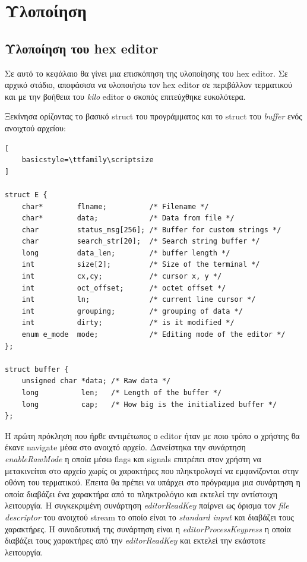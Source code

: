 \section{Υλοποίηση}
\subsection{Υλοποίηση του hex editor}
Σε αυτό το κεφάλαιο θα γίνει μια επισκόπηση της υλοποίησης του hex editor.
Σε αρχικό στάδιο, αποφάσισα να υλοποιήσω τον hex editor σε περιβάλλον τερματικού και με την βοήθεια του \emph{kilo} editor ο σκοπός επιτεύχθηκε ευκολότερα.

Ξεκίνησα ορίζοντας το βασικό struct του προγράμματος και το struct του \emph{buffer} ενός ανοιχτού αρχείου:


\begin{lstlisting}[
    basicstyle=\ttfamily\scriptsize
]

struct E {
	char*        flname;          /* Filename */
	char*        data;            /* Data from file */
	char         status_msg[256]; /* Buffer for custom strings */
	char         search_str[20];  /* Search string buffer */
	long         data_len;        /* buffer length */
	int          size[2];         /* Size of the terminal */
	int          cx,cy;           /* cursor x, y */
	int          oct_offset;      /* octet offset */
	int          ln;              /* current line cursor */
	int          grouping;        /* grouping of data */
	int          dirty;           /* is it modified */
	enum e_mode  mode;            /* Editing mode of the editor */
};

struct buffer {
	unsigned char *data; /* Raw data */
	long          len;   /* Length of the buffer */
	long          cap;   /* How big is the initialized buffer */
};
\end{lstlisting}

Η πρώτη πρόκληση που ήρθε αντιμέτωπος ο editor ήταν με ποιο τρόπο ο χρήστης θα έκανε navigate μέσα στο ανοιχτό αρχείο.
Δανείστηκα την συνάρτηση \emph{enableRawMode} η οποία μέσω flags και signals επιτρέπει στον χρήστη να μετακινείται στο αρχείο χωρίς οι χαρακτήρες που πληκτρολογεί να εμφανίζονται στην οθόνη του τερματικού.
Έπειτα θα πρέπει να υπάρχει στο πρόγραμμα μια συνάρτηση η οποία διαβάζει ένα χαρακτήρα από το πληκτρολόγιο και εκτελεί την αντίστοιχη λειτουργία.
Η συγκεκριμένη συνάρτηση \emph{editorReadKey} παίρνει ως όρισμα τον \emph{file descriptor} του ανοιχτού stream το οποίο είναι το \emph{standard input} και διαβάζει τους χαρακτήρες.
H συνοδευτική της συνάρτηση είναι η \emph{editorProcessKeypress} η οποία διαβάζει τους χαρακτήρες από την \emph{editorReadKey} και εκτελεί την εκάστοτε λειτουργία.

